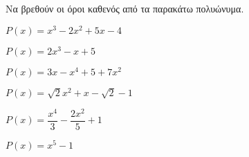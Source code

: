 Να βρεθούν οι όροι καθενός από τα παρακάτω πολυώνυμα.
\begin{multicols}{2}
\begin{alist}
\item $ P(x)=x^3-2x^2+5x-4 $
\item $ P(x)=2x^3-x+5 $
\item $ P(x)=3x-x^4+5+7x^2 $
\item $ P(x)=\sqrt{2}x^2+x-\sqrt{2}-1 $
\item $ P(x)=\dfrac{x^4}{3}-\dfrac{2x^2}{5}+1 $
\item $ P(x)=x^5-1 $
\end{alist}
\end{multicols}
